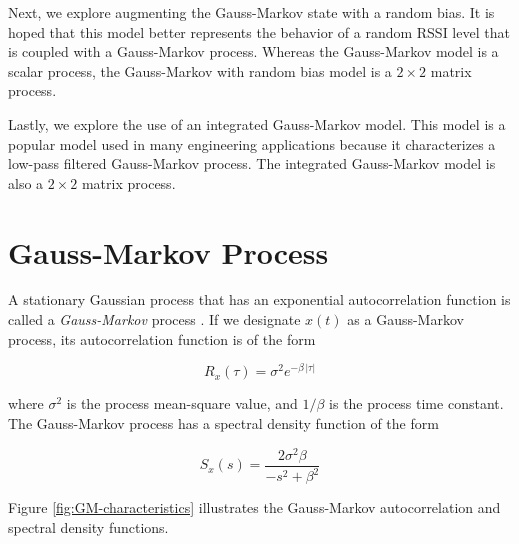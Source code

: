\documentclass[12pt]{article}
\begin{document}
Next, we explore augmenting the Gauss-Markov state with a random bias. It is hoped that
this model better represents the behavior of a random RSSI level that is coupled with
a Gauss-Markov process. Whereas the Gauss-Markov model is a scalar process, the Gauss-Markov
with random bias model is a $2 \times 2$ matrix process.

Lastly, we explore the use of an integrated Gauss-Markov model. This model is a popular
model used in many engineering applications because it characterizes a low-pass filtered
Gauss-Markov process. The integrated Gauss-Markov model is also a $2 \times 2$ matrix
process.



%
%

\clearpage
\section{Gauss-Markov Process}

A stationary Gaussian process that has an exponential autocorrelation function is called
a \emph{Gauss-Markov} process \cite{rgbrown1983}. If we designate $x(t)$ as a Gauss-Markov
process, its autocorrelation function is of the form

\begin{equation}
    R_x(\tau) = \sigma^2 e^{-\beta \, \lvert \tau \rvert}
    \label{eq:GM-autocorrelation}
\end{equation}

where $\sigma^2$ is the process mean-square value, and $1 / \beta$ is the process time
constant. The Gauss-Markov process has a spectral density function of the form

\begin{equation}
    S_x(s) = \frac{2 \sigma^2 \beta}{-s^2 + \beta^2}
    \label{eq:GM-spectral-function}
\end{equation}

Figure \ref{fig:GM-characteristics} illustrates the Gauss-Markov autocorrelation
and spectral density functions.
\end{document}
